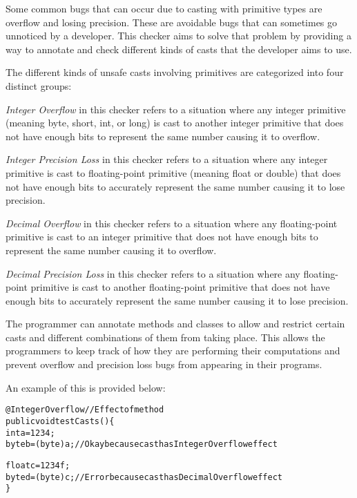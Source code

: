 \htmlhr
{}

Some common bugs that can occur due to casting with primitive types are overflow and losing precision. These are avoidable bugs that can sometimes go unnoticed by a developer. This checker aims to solve that problem by providing a way to annotate and check different kinds of casts that the developer aims to use.

\noindent
The different kinds of unsafe casts involving primitives are categorized into four distinct groups:

\emph{Integer Overflow} in this checker refers to a situation where any integer primitive (meaning byte, short, int, or long) is cast to another integer primitive that does not have enough bits to represent the same number causing it to overflow.

\emph{Integer Precision Loss} in this checker refers to a situation where any integer primitive is cast to floating-point primitive (meaning float or double) that does not have enough bits to accurately represent the same number causing it to lose precision.

\emph{Decimal Overflow} in this checker refers to a situation where any floating-point primitive is cast to an integer primitive that does not have enough bits to represent the same number causing it to overflow.

\emph{Decimal Precision Loss} in this checker refers to a situation where any floating-point primitive is cast to another floating-point primitive that does not have enough bits to accurately represent the same number causing it to lose precision.

The programmer can annotate methods and classes to allow and restrict certain casts and different combinations of them from taking place. This allows the programmers to keep track of how they are performing their computations and prevent overflow and precision loss bugs from appearing in their programs.

\noindent
An example of this is provided below:

\begin{alltt}
@IntegerOverflow //Effect of method
public void testCasts() \{
    int a = 1234;
    byte b = (byte) a; //Okay because cast has IntegerOverflow effect

    float c = 1234f;
    byte d = (byte) c; //Error because cast has DecimalOverflow effect
\}
\end{alltt}

